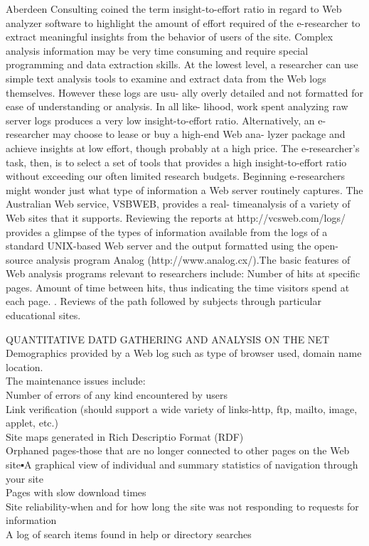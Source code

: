 \documentclass[a4paper,12pt]{article}
\begin{document}
\noindent      
Aberdeen Consulting coined the term insight-to-effort ratio in regard to Web analyzer software to highlight the amount of effort required of the e-researcher to extract meaningful insights from the behavior of users of the site. Complex analysis information may be very time consuming and require special programming and data extraction skills. At the lowest level, a researcher can use simple text analysis tools to examine and extract data from the Web logs themselves. However these logs are usu- ally overly detailed and not formatted for ease of understanding or analysis. In all like- lihood, work spent analyzing raw server logs produces a very low insight-to-effort ratio. Alternatively, an e-researcher may choose to lease or buy a high-end Web ana- lyzer package and achieve insights at low effort, though probably at a high price. The e-researcher's task, then, is to select a set of tools that provides a high insight-to-effort ratio without exceeding our often limited research budgets. Beginning e-researchers might wonder just what type of information a Web server routinely captures. The Australian Web service, VSBWEB, provides a real- timeanalysis of a variety of Web sites that it supports. Reviewing the reports at http://vcsweb.com/logs/ provides a glimpse of the types of information available from the logs of a standard UNIX-based Web server and the output formatted using the open-source analysis program Analog (http://www.analog.cx/).The basic features of Web analysis programs relevant to researchers include: Number of hits at specific pages. Amount of time between hits, thus indicating the time visitors spend at each page. . Reviews of the path followed by subjects through particular educational sites.
\vspace{0.1cm}
\vspace{0.1cm}

\noindent
QUANTITATIVE DATD GATHERING AND ANALYSIS ON THE NET \\

\noindent
  Demographics provided by a Web log such as type of browser used, domain name location.\\

\noindent
 The maintenance issues include:\\ 

\noindent
 Number of errors of any kind encountered by users\\
\noindent
 Link verification (should support a wide variety of links-http, ftp, mailto, image, applet, etc.)\\
\noindent 
Site maps generated in Rich Descriptio Format (RDF)\\
\noindent 
 Orphaned pages-those that are no longer connected to other pages on the Web site▪︎A graphical view of individual and summary statistics of navigation through your site\\
\noindent 
 Pages with slow download times\\
\noindent 
Site reliability-when and for how long the site was not responding to requests for information\\
\noindent 
A log of search items found in help or directory searches\\
\end{document}
